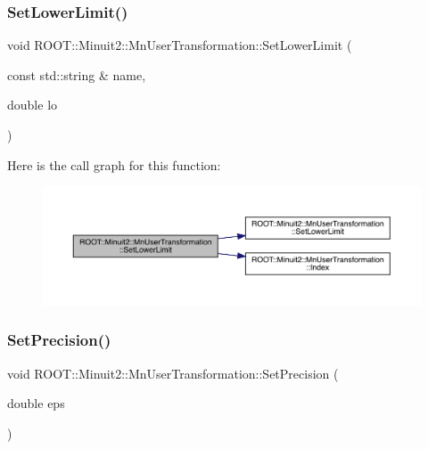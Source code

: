 \subsubsection{\texorpdfstring{SetLowerLimit()}{SetLowerLimit()}\hspace{0.1cm}{\footnotesize\ttfamily [6/6]}}
{\footnotesize\ttfamily void R\+O\+O\+T\+::\+Minuit2\+::\+Mn\+User\+Transformation\+::\+Set\+Lower\+Limit (\begin{DoxyParamCaption}\item[{const std\+::string \&}]{name,  }\item[{double}]{lo }\end{DoxyParamCaption})}

Here is the call graph for this function\+:
\nopagebreak
\begin{figure}[H]
\begin{center}
\leavevmode
\includegraphics[width=350pt]{d9/d98/classROOT_1_1Minuit2_1_1MnUserTransformation_aebc0f6d54f3ae5d58b86435529c16796_cgraph}
\end{center}
\end{figure}
\mbox{\label{classROOT_1_1Minuit2_1_1MnUserTransformation_aa80f289974f19753a2912a8eb6311f53}} 
\subsubsection{\texorpdfstring{SetPrecision()}{SetPrecision()}\hspace{0.1cm}{\footnotesize\ttfamily [1/3]}}
{\footnotesize\ttfamily void R\+O\+O\+T\+::\+Minuit2\+::\+Mn\+User\+Transformation\+::\+Set\+Precision (\begin{DoxyParamCaption}\item[{double}]{eps }\end{DoxyParamCaption})\hspace{0.3cm}{\ttfamily [inline]}}

